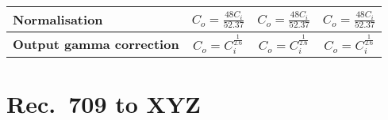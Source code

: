 \documentclass{article}
\begin{document}
\begin{minipage}{\textwidth}
\begin{tabular}{|l|c|c|c|}
\hline
\textbf{Normalisation} &
\parbox[c][4em][c]{3cm}{ \(\displaystyle C_o = \frac{48 C_i}{52.37}\)} &
\parbox[c][4em][c]{3cm}{ \(\displaystyle C_o = \frac{48 C_i}{52.37}\)} &
\parbox[c][4em][c]{3cm}{ \(\displaystyle C_o = \frac{48 C_i}{52.37}\)} \\

\hline
\parbox[c][2em][c]{2cm}{\textbf{Output gamma correction}} &
\parbox[c][4em][c]{3cm}{\(\displaystyle C_o = C_i^{\frac{1}{2.6}} \)} &
\parbox[c][4em][c]{3cm}{\(\displaystyle C_o = C_i^{\frac{1}{2.6}} \)} &
\parbox[c][4em][c]{3cm}{\(\displaystyle C_o = C_i^{\frac{1}{2.6}} \)} \\
\hline

\end{tabular}
\end{minipage}




\section{Rec.\ 709 to XYZ}
\end{document}
